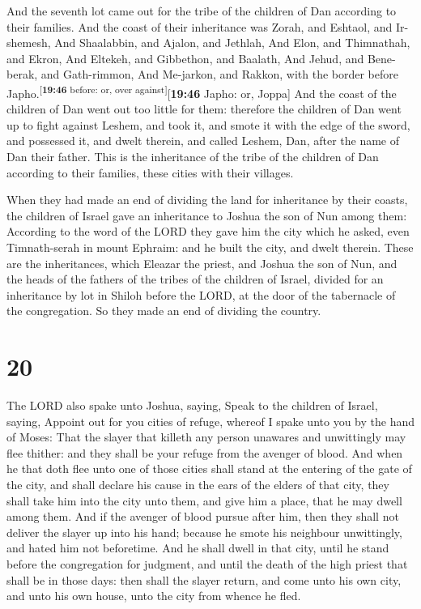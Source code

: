  And the seventh lot came out for the tribe of the
children of Dan according to their families.  And the
coast of their inheritance was Zorah, and Eshtaol, and Ir-shemesh,
 And Shaalabbin, and Ajalon, and Jethlah, 
And Elon, and Thimnathah, and Ekron,  And Eltekeh, and
Gibbethon, and Baalath,  And Jehud, and Bene-berak, and
Gath-rimmon,  And Me-jarkon, and Rakkon, with the border
before Japho.\textsuperscript{{[}\textbf{19:46} before: or, over
against{]}}{[}\textbf{19:46} Japho: or, Joppa{]}  And the
coast of the children of Dan went out too little for them: therefore the
children of Dan went up to fight against Leshem, and took it, and smote
it with the edge of the sword, and possessed it, and dwelt therein, and
called Leshem, Dan, after the name of Dan their father. 
This is the inheritance of the tribe of the children of Dan according to
their families, these cities with their villages.

 When they had made an end of dividing the land for
inheritance by their coasts, the children of Israel gave an inheritance
to Joshua the son of Nun among them:  According to the
word of the LORD they gave him the city which he asked, even
Timnath-serah in mount Ephraim: and he built the city, and dwelt
therein.  These are the inheritances, which Eleazar the
priest, and Joshua the son of Nun, and the heads of the fathers of the
tribes of the children of Israel, divided for an inheritance by lot in
Shiloh before the LORD, at the door of the tabernacle of the
congregation. So they made an end of dividing the country.

\hypertarget{section-19}{%
\section{20}\label{section-19}}

 The LORD also spake unto Joshua, saying, 
Speak to the children of Israel, saying, Appoint out for you cities of
refuge, whereof I spake unto you by the hand of Moses: 
That the slayer that killeth any person unawares and unwittingly may
flee thither: and they shall be your refuge from the avenger of blood.
 And when he that doth flee unto one of those cities shall
stand at the entering of the gate of the city, and shall declare his
cause in the ears of the elders of that city, they shall take him into
the city unto them, and give him a place, that he may dwell among them.
 And if the avenger of blood pursue after him, then they
shall not deliver the slayer up into his hand; because he smote his
neighbour unwittingly, and hated him not beforetime.  And
he shall dwell in that city, until he stand before the congregation for
judgment, and until the death of the high priest that shall be in those
days: then shall the slayer return, and come unto his own city, and unto
his own house, unto the city from whence he fled.

